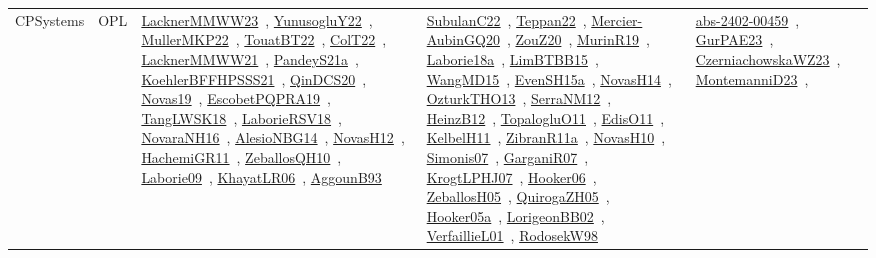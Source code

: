 {\begin{longtable}{lp{3cm}>{\raggedright\arraybackslash}p{6cm}>{\raggedright\arraybackslash}p{6cm}>{\raggedright\arraybackslash}p{8cm}}
CPSystems & OPL & \href{works/LacknerMMWW23.pdf}{LacknerMMWW23}~\cite{LacknerMMWW23}, \href{works/YunusogluY22.pdf}{YunusogluY22}~\cite{YunusogluY22}, \href{works/MullerMKP22.pdf}{MullerMKP22}~\cite{MullerMKP22}, \href{works/TouatBT22.pdf}{TouatBT22}~\cite{TouatBT22}, \href{works/ColT22.pdf}{ColT22}~\cite{ColT22}, \href{works/LacknerMMWW21.pdf}{LacknerMMWW21}~\cite{LacknerMMWW21}, \href{works/PandeyS21a.pdf}{PandeyS21a}~\cite{PandeyS21a}, \href{works/KoehlerBFFHPSSS21.pdf}{KoehlerBFFHPSSS21}~\cite{KoehlerBFFHPSSS21}, \href{works/QinDCS20.pdf}{QinDCS20}~\cite{QinDCS20}, \href{works/Novas19.pdf}{Novas19}~\cite{Novas19}, \href{works/EscobetPQPRA19.pdf}{EscobetPQPRA19}~\cite{EscobetPQPRA19}, \href{works/TangLWSK18.pdf}{TangLWSK18}~\cite{TangLWSK18}, \href{works/LaborieRSV18.pdf}{LaborieRSV18}~\cite{LaborieRSV18}, \href{works/NovaraNH16.pdf}{NovaraNH16}~\cite{NovaraNH16}, \href{works/AlesioNBG14.pdf}{AlesioNBG14}~\cite{AlesioNBG14}, \href{works/NovasH12.pdf}{NovasH12}~\cite{NovasH12}, \href{works/HachemiGR11.pdf}{HachemiGR11}~\cite{HachemiGR11}, \href{works/ZeballosQH10.pdf}{ZeballosQH10}~\cite{ZeballosQH10}, \href{works/Laborie09.pdf}{Laborie09}~\cite{Laborie09}, \href{works/KhayatLR06.pdf}{KhayatLR06}~\cite{KhayatLR06}, \href{works/AggounB93.pdf}{AggounB93}~\cite{AggounB93} & \href{works/SubulanC22.pdf}{SubulanC22}~\cite{SubulanC22}, \href{works/Teppan22.pdf}{Teppan22}~\cite{Teppan22}, \href{works/Mercier-AubinGQ20.pdf}{Mercier-AubinGQ20}~\cite{Mercier-AubinGQ20}, \href{works/ZouZ20.pdf}{ZouZ20}~\cite{ZouZ20}, \href{works/MurinR19.pdf}{MurinR19}~\cite{MurinR19}, \href{works/Laborie18a.pdf}{Laborie18a}~\cite{Laborie18a}, \href{works/LimBTBB15.pdf}{LimBTBB15}~\cite{LimBTBB15}, \href{works/WangMD15.pdf}{WangMD15}~\cite{WangMD15}, \href{works/EvenSH15a.pdf}{EvenSH15a}~\cite{EvenSH15a}, \href{works/NovasH14.pdf}{NovasH14}~\cite{NovasH14}, \href{works/OzturkTHO13.pdf}{OzturkTHO13}~\cite{OzturkTHO13}, \href{works/SerraNM12.pdf}{SerraNM12}~\cite{SerraNM12}, \href{works/HeinzB12.pdf}{HeinzB12}~\cite{HeinzB12}, \href{works/TopalogluO11.pdf}{TopalogluO11}~\cite{TopalogluO11}, \href{works/EdisO11.pdf}{EdisO11}~\cite{EdisO11}, \href{works/KelbelH11.pdf}{KelbelH11}~\cite{KelbelH11}, \href{works/ZibranR11a.pdf}{ZibranR11a}~\cite{ZibranR11a}, \href{works/NovasH10.pdf}{NovasH10}~\cite{NovasH10}, \href{works/Simonis07.pdf}{Simonis07}~\cite{Simonis07}, \href{works/GarganiR07.pdf}{GarganiR07}~\cite{GarganiR07}, \href{works/KrogtLPHJ07.pdf}{KrogtLPHJ07}~\cite{KrogtLPHJ07}, \href{works/Hooker06.pdf}{Hooker06}~\cite{Hooker06}, \href{works/ZeballosH05.pdf}{ZeballosH05}~\cite{ZeballosH05}, \href{works/QuirogaZH05.pdf}{QuirogaZH05}~\cite{QuirogaZH05}, \href{works/Hooker05a.pdf}{Hooker05a}~\cite{Hooker05a}, \href{works/LorigeonBB02.pdf}{LorigeonBB02}~\cite{LorigeonBB02}, \href{works/VerfaillieL01.pdf}{VerfaillieL01}~\cite{VerfaillieL01}, \href{works/RodosekW98.pdf}{RodosekW98}~\cite{RodosekW98} & \href{works/abs-2402-00459.pdf}{abs-2402-00459}~\cite{abs-2402-00459}, \href{works/GurPAE23.pdf}{GurPAE23}~\cite{GurPAE23}, \href{works/CzerniachowskaWZ23.pdf}{CzerniachowskaWZ23}~\cite{CzerniachowskaWZ23}, \href{works/MontemanniD23.pdf}{MontemanniD23}~\cite{MontemanniD23}, 
\end{longtable}}

